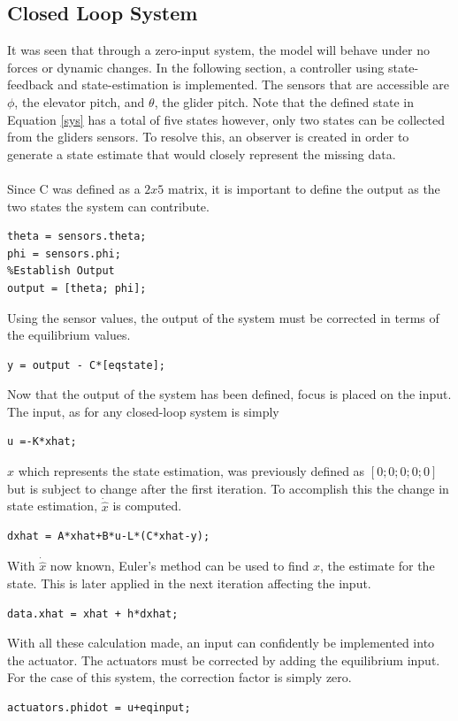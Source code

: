 \documentclass[12pt]{article}
\begin{document}
\subsection{Closed Loop System}
It was seen that through a zero-input system, the model will behave under no forces or dynamic changes. In the following section, a controller using state-feedback and state-estimation is implemented. The sensors that are accessible are $\phi$, the elevator pitch, and $\theta$, the glider pitch. Note that the defined state in Equation \eqref{sys} has a total of five states however, only two states can be collected from the gliders sensors. To resolve this, an observer is created in order to generate a state estimate that would closely represent the missing data. 
\\ \\
Since C was defined as a $2x5$ matrix, it is important to define the output as the two states the system can contribute.
\begin{lstlisting}[frame=single]
%Define Sensor Values
theta = sensors.theta;
phi = sensors.phi;
%Establish Output
output = [theta; phi];
\end{lstlisting}
Using the sensor values, the output of the system must be corrected in terms of the equilibrium values.
\begin{lstlisting}[frame=single]
%WHAT?
y = output - C*[eqstate];
\end{lstlisting}
Now that the output of the system has been defined, focus is placed on the input. The input, as for any closed-loop system is simply 
\begin{lstlisting}[frame=single]
%Input using estimated state
u =-K*xhat;
\end{lstlisting}
$\hat{x}$ which represents the state estimation, was previously defined as $[0; 0; 0; 0; 0]$ but is subject to change after the first iteration. To accomplish this the change in state estimation, $\dot{\hat{x}}$ is computed.
\begin{lstlisting}[frame=single]
%Next step for dxhat
dxhat = A*xhat+B*u-L*(C*xhat-y);
\end{lstlisting}
With $\dot{\hat{x}}$ now known, Euler's method can be used to find $\hat{x}$, the estimate for the state. This is later applied in the next iteration affecting the input.
\begin{lstlisting}[frame=single]
%Euler's Method for finding xhat
data.xhat = xhat + h*dxhat;
\end{lstlisting}
With all these calculation made, an input can confidently be implemented into the actuator. The actuators must be corrected by adding the equilibrium input. For the case of this system, the correction factor is simply zero. 
\begin{lstlisting}[frame=single]
%Applying controller to the input
actuators.phidot = u+eqinput;
\end{lstlisting}
\end{document}
